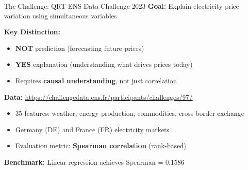 \documentclass[aspectratio=169]{beamer}
\begin{document}
\begin{frame}{The Challenge: QRT ENS Data Challenge 2023}
\textbf{Goal:} Explain electricity price variation using simultaneous variables

\vspace{0.3cm}
\textbf{Key Distinction:}
\begin{itemize}
    \item \textbf{NOT} prediction (forecasting future prices)
    \item \textbf{YES} explanation (understanding what drives prices today)
    \item Requires \textbf{causal understanding}, not just correlation
\end{itemize}

\vspace{0.3cm}
\textbf{Data:} \url{https://challengedata.ens.fr/participants/challenges/97/}
\begin{itemize}
    \item 35 features: weather, energy production, commodities, cross-border exchange
    \item Germany (DE) and France (FR) electricity markets
    \item Evaluation metric: \textbf{Spearman correlation} (rank-based)
\end{itemize}

\vspace{0.3cm}
\textbf{Benchmark:} Linear regression achieves Spearman = 0.1586
\end{frame}
\end{document}

